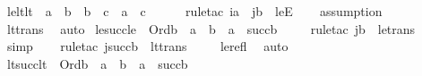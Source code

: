 \begin{isabellebody}
%
\isadelimproof
\isanewline
%
\endisadelimproof
\isanewline
{}\isamarkupfalse%
\ le{\isacharunderscore}{\kern0pt}lt{\isacharunderscore}{\kern0pt}lt\ {\isacharcolon}{\kern0pt}\ {\isachardoublequoteopen}a\ {\isasymle}\ b\ {\isasymLongrightarrow}\ b\ {\isacharless}{\kern0pt}\ c\ {\isasymLongrightarrow}\ a\ {\isacharless}{\kern0pt}\ c{\isachardoublequoteclose}\ \ \isanewline
%
\isadelimproof
\ \ %
\endisadelimproof
%
\isatagproof
{}\isamarkupfalse%
\ {\isacharparenleft}{\kern0pt}rule{\isacharunderscore}{\kern0pt}tac\ i{\isacharequal}{\kern0pt}a\ \ j{\isacharequal}{\kern0pt}b\ \ leE{\isacharparenright}{\kern0pt}\isanewline
\ \ \isamarkupfalse%
\ assumption\ \isanewline
\ \ \isamarkupfalse%
\ lt{\isacharunderscore}{\kern0pt}trans\ \isamarkupfalse%
\ auto%
\endisatagproof
{\isafoldproof}%
%
\isadelimproof
\isanewline
%
\endisadelimproof
\isanewline
{}\isamarkupfalse%
\ le{\isacharunderscore}{\kern0pt}succ{\isacharunderscore}{\kern0pt}le\ {\isacharcolon}{\kern0pt}\ {\isachardoublequoteopen}Ord{\isacharparenleft}{\kern0pt}b{\isacharparenright}{\kern0pt}\ {\isasymLongrightarrow}\ a\ {\isasymle}\ b\ {\isasymLongrightarrow}\ a\ {\isasymle}\ succ{\isacharparenleft}{\kern0pt}b{\isacharparenright}{\kern0pt}{\isachardoublequoteclose}\ \isanewline
%
\isadelimproof
\ \ %
\endisadelimproof
%
\isatagproof
{}\isamarkupfalse%
\ {\isacharparenleft}{\kern0pt}rule{\isacharunderscore}{\kern0pt}tac\ j{\isacharequal}{\kern0pt}b\ \ le{\isacharunderscore}{\kern0pt}trans{\isacharparenright}{\kern0pt}\ \isanewline
\ \ \isamarkupfalse%
\ simp\isanewline
\ \ \isamarkupfalse%
\ {\isacharparenleft}{\kern0pt}rule{\isacharunderscore}{\kern0pt}tac\ j{\isacharequal}{\kern0pt}{\isachardoublequoteopen}succ{\isacharparenleft}{\kern0pt}b{\isacharparenright}{\kern0pt}{\isachardoublequoteclose}\ \ lt{\isacharunderscore}{\kern0pt}trans{\isacharparenright}{\kern0pt}\ \isanewline
\ \ \isamarkupfalse%
\ le{\isacharunderscore}{\kern0pt}refl\ \isamarkupfalse%
\ auto%
\endisatagproof
{\isafoldproof}%
%
\isadelimproof
\isanewline
%
\endisadelimproof
\isanewline
{}\isamarkupfalse%
\ lt{\isacharunderscore}{\kern0pt}succ{\isacharunderscore}{\kern0pt}lt\ {\isacharcolon}{\kern0pt}\ {\isachardoublequoteopen}Ord{\isacharparenleft}{\kern0pt}b{\isacharparenright}{\kern0pt}\ {\isasymLongrightarrow}\ a\ {\isacharless}{\kern0pt}\ b\ {\isasymLongrightarrow}\ a\ {\isacharless}{\kern0pt}\ succ{\isacharparenleft}{\kern0pt}b{\isacharparenright}{\kern0pt}{\isachardoublequoteclose}\ \isanewline

\end{isabellebody}
